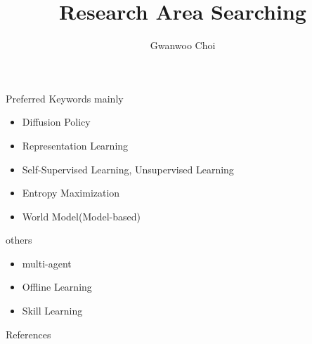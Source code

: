 \documentclass{beamer}
\title{Research Area Searching}
\author{Gwanwoo Choi}
\begin{document}

\begin{frame}
    \titlepage
\end{frame}





\begin{frame}{Preferred Keywords}
    mainly
    \begin{itemize}
        \item Diffusion Policy
        \item Representation Learning
        \item Self-Supervised Learning, Unsupervised Learning
        \item Entropy Maximization
        \item World Model(Model-based)
    \end{itemize}

    others
    \begin{itemize}
        \item multi-agent
        \item Offline Learning
        \item Skill Learning
    \end{itemize}
\end{frame}

\begin{frame}[allowframebreaks]{References}
    \printbibliography
\end{frame}
\end{document}
